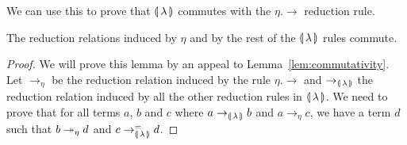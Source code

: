 We can use this to prove that $\llparenthesis \, \lambda \, \rrparenthesis$ commutes with the
$\eta.\to$ reduction rule.

\begin{lemma}\label{lem:eta-commutes}

  The reduction relations induced by $\eta$ and by the rest of the
  $\llparenthesis \, \lambda \, \rrparenthesis$ rules commute.
\end{lemma}

\begin{proof}
  We will prove this lemma by an appeal to
  Lemma~\ref{lem:commutativity}. Let $\to_\eta$ be the reduction relation
  induced by the rule $\eta.\to$ and $\to_{\llparenthesis \, \lambda \, \rrparenthesis}$ the reduction
  relation induced by all the other reduction rules in
  $\llparenthesis \, \lambda \, \rrparenthesis$. We need to prove that for all terms $a$, $b$ and $c$
  where $a \to_{\llparenthesis \, \lambda \, \rrparenthesis} b$ and $a \to_\eta c$, we have a term $d$ such that
  $b \twoheadrightarrow_\eta d$ and $c \to_{\llparenthesis \, \lambda \, \rrparenthesis}^= d$.


\end{proof}
